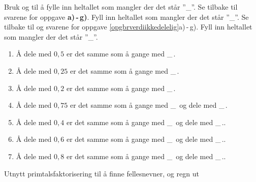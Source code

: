 Bruk  og  til å fylle inn heltallet som mangler der det står ''\_''.
Se tilbake til svarene for oppgave \textbf{a)\,-\,g)}. Fyll inn heltallet som mangler der det står ''\_''.
\newpage
{}
Se tilbake til  og svarene for oppgave \ref{opgbrverdiikkedelelig}a)\,-\,g).
Fyll inn heltallet som mangler der det står ''\_''.
{\renewcommand{\labelenumi}{(\alph{enumi})}
	\begin{enumerate}
		\item Å dele med $ 0,5 $ er det samme som å gange med \_\,.
		\item Å dele med $ 0,25 $ er det samme som å gange med \_\,.
		\item Å dele med $ 0,2 $ er det samme som å gange med \_\,.
		\item Å dele med $ 0,75 $ er det samme som å gange med \_\, og dele med \_\,.
		\item Å dele med $ 0,4 $ er det samme som å gange med \_\, og dele med \_\,..
		\item Å dele med $ 0,6 $ er det samme som å gange med \_\, og dele med \_\,..
		\item Å dele med $ 0,8 $ er det samme som å gange med \_\, og dele med \_\,..	
\end{enumerate} }

Utnytt primtalsfaktorisering til å finne fellesnevner, og regn ut\os
{}
\newpage



